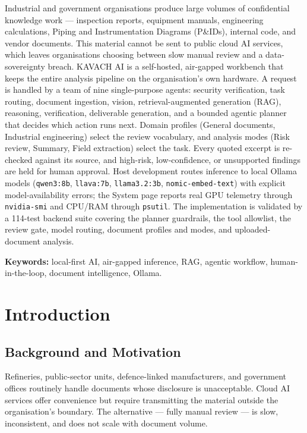 \documentclass[11pt,a4paper]{article}
\newcommand{\projectname}{KAVACH AI}
\begin{document}
Industrial and government organisations produce large volumes of confidential
knowledge work --- inspection reports, equipment manuals, engineering
calculations, Piping and Instrumentation Diagrams (P\&IDs), internal code, and
vendor documents. This material cannot be sent to public cloud AI services,
which leaves organisations choosing between slow manual review and a
data-sovereignty breach. \projectname{} is a self-hosted, air-gapped workbench
that keeps the entire analysis pipeline on the organisation's own hardware.
A request is handled by a team of nine single-purpose agents: security
verification, task routing, document ingestion, vision, retrieval-augmented
generation (RAG), reasoning, verification, deliverable generation, and a
bounded agentic planner that decides which action runs next. Domain profiles
(General documents, Industrial engineering) select the review vocabulary, and
analysis modes (Risk review, Summary, Field extraction) select the task. Every
quoted excerpt is re-checked against its source, and high-risk, low-confidence,
or unsupported findings are held for human approval. Host development routes
inference to local Ollama models (\texttt{qwen3:8b}, \texttt{llava:7b},
\texttt{llama3.2:3b}, \texttt{nomic-embed-text}) with explicit model-availability errors; the System page reports real GPU telemetry through
\texttt{nvidia-smi} and CPU/RAM through \texttt{psutil}. The implementation is
validated by a 114-test backend suite covering the planner guardrails, the tool
allowlist, the review gate, model routing, document profiles and modes, and
uploaded-document analysis.

\medskip
\noindent\textbf{Keywords:} local-first AI, air-gapped inference, RAG,
agentic workflow, human-in-the-loop, document intelligence, Ollama.

\newpage
\tableofcontents
\newpage

\section{Introduction}

\subsection{Background and Motivation}
Refineries, public-sector units, defence-linked manufacturers, and government
offices routinely handle documents whose disclosure is unacceptable. Cloud AI
services offer convenience but require transmitting the material outside the
organisation's boundary. The alternative --- fully manual review --- is slow,
inconsistent, and does not scale with document volume.
\end{document}
